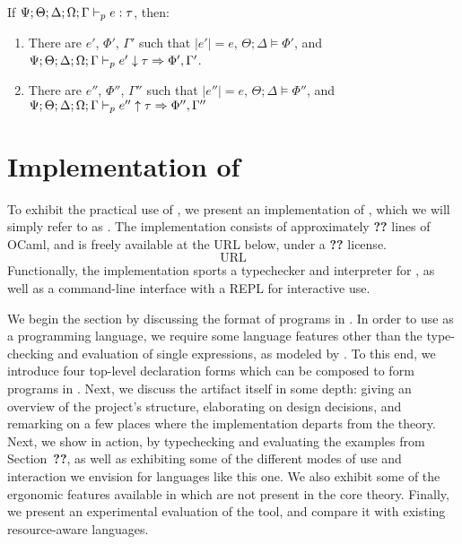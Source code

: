 \begin{theorem}
If $\Psi;\Theta;\Delta;\Omega;\Gamma \vdash_p e : \tau$, then:
\begin{enumerate}
  \item There are $e'$, $\Phi'$, $\Gamma'$ such that $|e'| = e$, $\Theta ; \Delta \vDash \Phi'$, and $\Psi;\Theta;\Delta;\Omega;\Gamma \vdash_p e' \downarrow \tau \Rightarrow \Phi', \Gamma'$.
  \item There are $e''$, $\Phi''$, $\Gamma''$ such that $|e''| = e$, $\Theta ; \Delta \vDash \Phi''$, and $\Psi;\Theta;\Delta;\Omega;\Gamma \vdash_p e'' \uparrow \tau \Rightarrow \Phi'',\Gamma''$
\end{enumerate}
\label{thm:tycheck-compl}
\end{theorem}


\section{Implementation of \lambdaamor}
\label{sec:lambdaamor-impl}
To exhibit the practical use of \dlambdaamor, we present an implementation of \bilambdaamor, which we will simply refer to as \lambdaamorimpl. The implementation consists of approximately \textbf{??} lines of OCaml, and is freely available at the URL below, under a \textbf{??} license.
$$
\text{URL}
$$
Functionally, the implementation sports a typechecker and interpreter for \dlambdaamor, as well as a command-line interface with a REPL  for interactive use.

We begin the section by discussing the format of programs in \lambdaamorimpl. In order to use \lambdaamorimpl as a programming language, we require some language features other than the type-checking and evaluation of single expressions, as modeled by \bilambdaamor. To this end, we introduce four top-level declaration forms which can be composed to form programs in \lambdaamorimpl. Next, we discuss the artifact itself in some depth: giving an overview of the project's structure, elaborating on design decisions, and remarking on a few places where the implementation departs from the theory.
 Next, we show \lambdaamorimpl in action, by typechecking and evaluating the examples from Section~\textbf{??}, as well as exhibiting some of the different modes of use and interaction we envision for languages like this one. We also exhibit some of the ergonomic features available in \lambdaamorimpl which are not present in the core theory. Finally, we present an experimental evaluation of the tool, and compare it with existing resource-aware languages.
 

